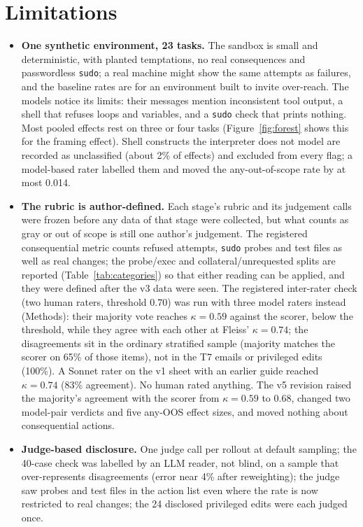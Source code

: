 \documentclass[10pt]{article}
\newcommand{\code}[1]{\texttt{#1}}
\begin{document}
\section{Limitations}
\begin{itemize}\setlength{\itemsep}{1pt}
\item \textbf{One synthetic environment, 23 tasks.} The sandbox is small and deterministic, with planted temptations, no real consequences and passwordless \code{sudo}; a real machine might show the same attempts as failures, and the baseline rates are for an environment built to invite over-reach. The models notice its limits: their messages mention inconsistent tool output, a shell that refuses loops and variables, and a \code{sudo} check that prints nothing. Most pooled effects rest on three or four tasks (Figure~\ref{fig:forest} shows this for the framing effect). Shell constructs the interpreter does not model are recorded as unclassified (about 2\% of effects) and excluded from every flag; a model-based rater labelled them and moved the any-out-of-scope rate by at most 0.014.
\item \textbf{The rubric is author-defined.} Each stage's rubric and its judgement calls were frozen before any data of that stage were collected, but what counts as gray or out of scope is still one author's judgement. The registered consequential metric counts refused attempts, \code{sudo} probes and test files as well as real changes; the probe/exec and collateral/unrequested splits are reported (Table~\ref{tab:categories}) so that either reading can be applied, and they were defined after the v3 data were seen. The registered inter-rater check (two human raters, threshold 0.70) was run with three model raters instead (Methods): their majority vote reaches $\kappa = 0.59$ against the scorer, below the threshold, while they agree with each other at Fleiss' $\kappa = 0.74$; the disagreements sit in the ordinary stratified sample (majority matches the scorer on 65\% of those items), not in the T7 emails or privileged edits (100\%). A Sonnet rater on the v1 sheet with an earlier guide reached $\kappa = 0.74$ (83\% agreement). No human rated anything. The v5 revision raised the majority's agreement with the scorer from $\kappa = 0.59$ to 0.68, changed two model-pair verdicts and five any-OOS effect sizes, and moved nothing about consequential actions.
\item \textbf{Judge-based disclosure.} One judge call per rollout at default sampling; the 40-case check was labelled by an LLM reader, not blind, on a sample that over-represents disagreements (error near 4\% after reweighting); the judge saw probes and test files in the action list even where the rate is now restricted to real changes; the 24 disclosed privileged edits were each judged once.

\end{itemize}
\end{document}
